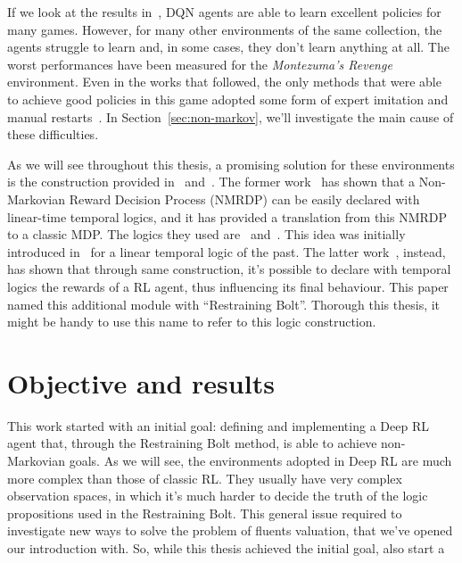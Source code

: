 If we look at the results in~\cite{bib:atari-deepq-nature}, DQN agents are
able to learn excellent policies for many games. However, for many other
environments of the same collection, the agents struggle to learn and, in some
cases, they don't learn anything at all. The worst performances have been
measured for the \emph{Montezuma's Revenge} environment. Even in the works
that followed, the only methods that were able to achieve good policies in
this game adopted some form of expert imitation and manual
restarts~\cite{bib:mz-openai-demonstrations}. In Section~\ref{sec:non-markov},
we'll investigate the main cause of these difficulties.

As we will see throughout this thesis, a promising solution for these
environments is the construction provided in~\cite{bib:degiacomo-logic-nmrdp}
and~\cite{bib:bolt}. The former work~\cite{bib:degiacomo-logic-nmrdp} has
shown that a Non-Markovian Reward Decision Process (NMRDP) can be easily
declared with linear-time temporal logics, and it has provided a translation
from this NMRDP to a classic MDP. The logics they used are~\ltl{} and~\ldl{}.
This idea was initially introduced in~\cite{bib:nmrdp-logic-first} for a
linear temporal logic of the past. The latter work~\cite{bib:bolt}, instead,
has shown that through same construction, it's possible to declare with
temporal logics the rewards of a RL agent, thus influencing its final
behaviour.  This paper named this additional module with ``Restraining Bolt''.
Thorough this thesis, it might be handy to use this name to refer to this
logic construction.


\section{Objective and results}

\label{sec:intro-objective}

This work started with an initial goal: defining and implementing a Deep
RL agent that, through the Restraining Bolt method, is able to achieve
non-Markovian goals. As we will see, the environments adopted in Deep RL are
much more complex than those of classic RL. They usually have very complex
observation spaces, in which it's much harder to decide the truth of the logic
propositions used in the Restraining Bolt. This general issue required to
investigate new ways to solve the problem of fluents valuation, that we've
opened our introduction with. So, while this thesis achieved the initial goal,
also start a

